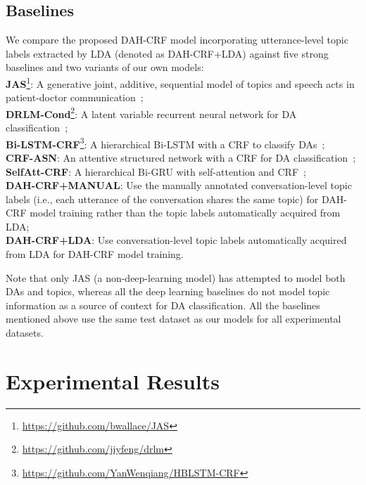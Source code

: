 \documentclass[11pt,a4paper]{article}
\begin{document}
\subsection{Baselines}
We compare the proposed DAH-CRF model incorporating utterance-level topic labels extracted by LDA (denoted as DAH-CRF+LDA) against five strong baselines and two variants of our own models:\\
\textbf{JAS}\footnote{\url{https://github.com/bwallace/JAS}}: A generative joint, additive, sequential model of topics and speech acts in patient-doctor communication~\cite{wallace2013generative};\\
\textbf{DRLM-Cond}\footnote{\url{https://github.com/jiyfeng/drlm}}: A latent variable recurrent neural network for DA classification~\cite{ji2016latent};\\
\textbf{Bi-LSTM-CRF}\footnote{\url{https://github.com/YanWenqiang/HBLSTM-CRF}}: A hierarchical Bi-LSTM with a CRF 
to classify DAs~\cite{kumar2017dialogue};\\
\textbf{CRF-ASN}: An attentive structured network with a CRF for DA classification~\cite{chen2018dialogue};\\
\textbf{SelfAtt-CRF}: A hierarchical Bi-GRU with self-attention and CRF~\cite{raheja2019dialogue};\\
\textbf{DAH-CRF+MANUAL}: Use the manually annotated conversation-level topic labels (i.e., each utterance of the conversation shares the same topic) for DAH-CRF model training rather than the topic labels automatically acquired from LDA;\\
\textbf{DAH-CRF+LDA}: Use conversation-level topic labels automatically acquired from LDA for DAH-CRF model training.

Note that only JAS (a non-deep-learning model) has attempted to model both DAs and topics, whereas all the deep learning baselines do not model topic information as a source of context for DA classification. All the baselines mentioned above use the same test dataset as our models for all experimental datasets.



\section{Experimental Results}
\end{document}
